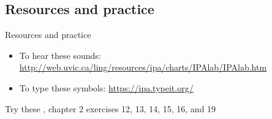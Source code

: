 \documentclass{beamer}
\newcommand{\subtwotwo}{Resources and practice}
\begin{document}
    \subsection{\subtwotwo}
      \begin{frame}{\subtwotwo}
        \begin{block}{}
          \begin{itemize}
            \item To hear these sounds: \url{http://web.uvic.ca/ling/resources/ipa/charts/IPAlab/IPAlab.htm}
            \item To type these symbols: \url{https://ipa.typeit.org/}
          \end{itemize}
        \end{block}
        \begin{block}{Try these}
          \textcite{dawson_language_2016}, chapter 2 exercises 12, 13, 14, 15, 16, and 19
        \end{block}
      \end{frame}
\end{document}
